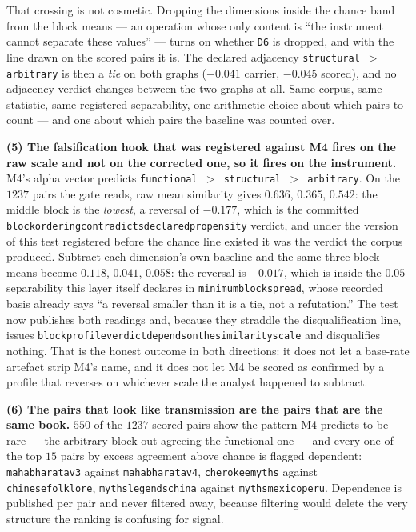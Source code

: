 \documentclass[11pt]{article}
\DeclareRobustCommand{\_}{\textunderscore\allowbreak}
\newcommand{\dimkey}[1]{\texttt{\small #1}}
\newcommand{\field}[1]{\texttt{\small #1}}
\begin{document}
That crossing is not cosmetic. Dropping the dimensions inside the chance band from the block
means --- an operation whose only content is ``the instrument cannot separate these values''
--- turns on whether \dimkey{D6} is dropped, and with the line drawn on the scored pairs it
is. The declared adjacency \texttt{structural \(>\) arbitrary} is then a \emph{tie} on both
graphs (\(-0.041\) carrier, \(-0.045\) scored), and no adjacency verdict changes between the
two graphs at all. Same corpus, same statistic, same registered separability, one arithmetic
choice about which pairs to count --- and one about which pairs the baseline was counted
over.

\textbf{(5) The falsification hook that was registered against M4 fires on the raw scale and
not on the corrected one, so it fires on the instrument.} M4's alpha vector predicts
\texttt{functional \(>\) structural \(>\) arbitrary}. On the \(1237\) pairs the gate reads,
raw mean similarity gives \(0.636\), \(0.365\), \(0.542\): the middle block is the
\emph{lowest}, a reversal of \(-0.177\), which is the committed
\texttt{block\_ordering\_contradicts\_declared\_propensity} verdict, and under the version of
this test registered before the chance line existed it was the verdict the corpus produced.
Subtract each dimension's own baseline and the same three block means become \(0.118\),
\(0.041\), \(0.058\): the reversal is \(-0.017\), which is inside the
\(0.05\) separability this layer itself declares in \field{minimum\_block\_spread}, whose
recorded basis already says ``a reversal smaller than it is a tie, not a refutation.'' The
test now publishes both readings and, because they straddle the disqualification line, issues
\texttt{block\_profile\_verdict\_depends\_on\_the\_similarity\_scale} and disqualifies
nothing. That is the honest outcome in both directions: it does not let a base-rate artefact
strip M4's name, and it does not let M4 be scored as confirmed by a profile that reverses on
whichever scale the analyst happened to subtract.

\textbf{(6) The pairs that look like transmission are the pairs that are the same book.}
\(550\) of the \(1237\) scored pairs show the pattern M4 predicts to be rare --- the
arbitrary block out-agreeing the functional one --- and every one of the top \(15\) pairs by
excess agreement above chance is flagged dependent: \texttt{mahabharata\_v3} against
\texttt{mahabharata\_v4}, \texttt{cherokee\_myths} against \texttt{chinese\_folklore},
\texttt{myths\_legends\_china} against \texttt{myths\_mexico\_peru}. Dependence is published
per pair and never filtered away, because filtering would delete the very structure the
ranking is confusing for signal.
\end{document}
